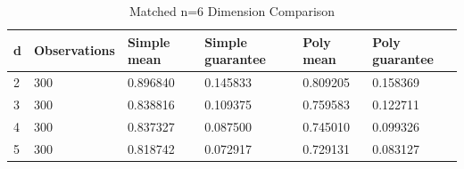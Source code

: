 \begin{table}[t]
\centering
\small
\caption{Matched n=6 Dimension Comparison}
\begin{tabular}{llllll}
\toprule
d & Observations & Simple mean & Simple guarantee & Poly mean & Poly guarantee \\
\midrule
2 & 300 & 0.896840 & 0.145833 & 0.809205 & 0.158369 \\
3 & 300 & 0.838816 & 0.109375 & 0.759583 & 0.122711 \\
4 & 300 & 0.837327 & 0.087500 & 0.745010 & 0.099326 \\
5 & 300 & 0.818742 & 0.072917 & 0.729131 & 0.083127 \\
\bottomrule
\end{tabular}
\end{table}
